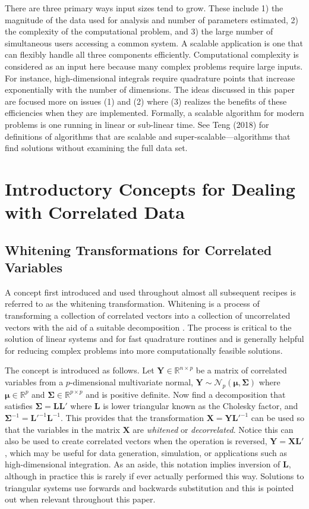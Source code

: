 \documentclass[12pt]{article}
\begin{document}
There are three primary ways input sizes tend to grow. These include 1) the magnitude of the data used for analysis and number of parameters estimated, 2) the complexity of the computational problem, and 3) the large number of simultaneous users accessing a common system. A scalable application is one that can flexibly handle all three components efficiently. Computational complexity is considered as an input here because many complex problems require large inputs. For instance, high-dimensional integrals require quadrature points that increase exponentially with the number of dimensions. The ideas discussed in this paper are focused more on issues (1) and (2) where (3) realizes the benefits of these efficiencies when they are implemented. Formally, a scalable algorithm for modern problems is one running in linear or sub-linear time. See Teng (2018) for definitions of algorithms that are scalable and super-scalable---algorithms that find solutions without examining the full data set. \nocite{teng:2}

\section*{Introductory Concepts for Dealing with Correlated Data}

\subsection*{Whitening Transformations for Correlated Variables}

A concept first introduced and used throughout almost all subsequent recipes is referred to as the whitening transformation. Whitening is a process of transforming a collection of correlated vectors into a collection of uncorrelated vectors with the aid of a suitable decomposition \cite{whiten}. The process is critical to the solution of linear systems and for fast quadrature routines and is generally helpful for reducing complex problems into more computationally feasible solutions. 

The concept is introduced as follows. Let $\bm{Y} \in \mathbb{R}^{n \times p}$ be a matrix of correlated variables from a $p$-dimensional multivariate normal, $\bm{Y} \sim \mathcal{N}_p(\bm{\mu}, \bm{\Sigma})$ where $\bm{\mu} \in \mathbb{R}^{p}$ and $\bm{\Sigma} \in \mathbb{R}^{p \times p}$ and is positive definite. Now find a decomposition that satisfies $\bm{\Sigma} = \bm{L}\bm{L}'$ where $\bm{L}$ is lower triangular known as the Cholesky factor, and $\bm{\Sigma}^{-1} = \bm{L'}^{-1}\bm{L}^{-1}$. This provides that the transformation $\bm{X} = \bm{Y}\bm{L}'^{-1}$ can be used so that the variables in the matrix $\bm{X}$ are \textit{whitened} or \textit{decorrelated}. Notice this can also be used to create correlated vectors when the operation is reversed, $\bm{Y}= \bm{X}\bm{L}'$, which may be useful for data generation, simulation, or applications such as high-dimensional integration. As an aside, this notation implies inversion of $\bm{L}$, although in practice this is rarely if ever actually performed this way. Solutions to triangular systems use forwards and backwards substitution and this is pointed out when relevant throughout this paper. 
\end{document}
